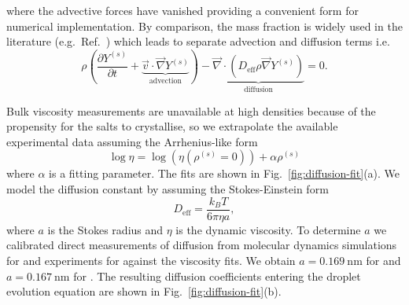 \documentclass[11pt,twoside]{report}
\begin{document}
where the advective forces have vanished providing a convenient form for numerical implementation.
By comparison, the mass fraction is widely used in the literature (e.g.\ Ref.\ \cite{HandscombCES2009}) which leads to separate advection and diffusion terms i.e.\
\begin{equation*}
  \rho \left(
  \frac{\partial Y^{(s)}}{\partial t} +
  \underbrace{\vec{v} \cdot \vec{\nabla} Y^{(s)}}_\textrm{advection}
  \right)
  -
  \underbrace{\vec{\nabla} \cdot (D_{\textrm{eff}} \rho \vec{\nabla} Y^{(s)})}_\textrm{diffusion}
  = 0.
\end{equation*}

Bulk viscosity measurements are unavailable at high densities because of the propensity for the salts to crystallise, so we extrapolate the available experimental data \cite{PowerCS2013}  assuming the Arrhenius-like form
\begin{equation}\label{eq:vft-fit}
  \log{\eta}
  =
  \log{\left(\eta(\rho^{(s)} = 0)\right)}
  + \alpha \rho^{(s)}
\end{equation}
where $\alpha$ is a fitting parameter.
The fits are shown in Fig.\ \ref{fig:diffusion-fit}(a).
We model the diffusion constant by assuming the Stokes-Einstein form
\begin{equation}\label{eq:stokes-einstein}
  D_\mathrm{eff} = \frac{k_B T}{6 \pi \eta a},
\end{equation}
where $a$ is the Stokes radius and $\eta$ is the dynamic viscosity.
To determine $a$ we calibrated direct measurements of diffusion from molecular dynamics simulations for \cite{LyubartsevJPC1996} and experiments for \cite{YehJCED1970} against the viscosity fits.
We obtain $a=\SI{0.169}{\nano\metre}$ for \ce{NaCl} and $a=\SI{0.167}{\nano\metre}$ for \ce{NaNO3}.
The resulting diffusion coefficients entering the droplet evolution equation are shown in Fig.\ \ref{fig:diffusion-fit}(b).
\end{document}
